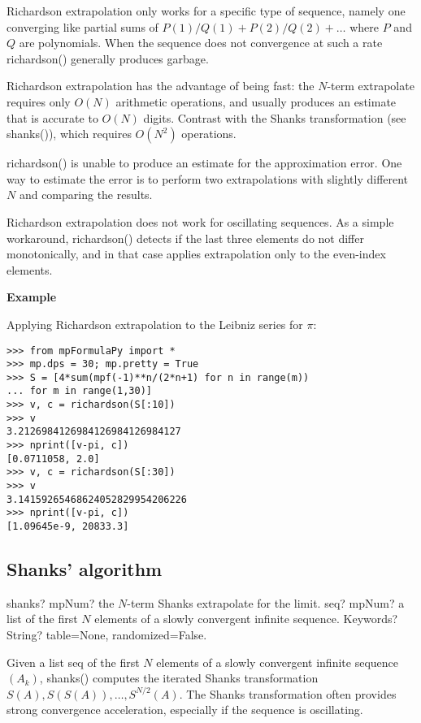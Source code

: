 Richardson extrapolation only works for a specific type of sequence, namely one converging like partial sums of $P(1)/Q(1) + P(2)/Q(2) + \dots$ where $P$ and $Q$ are polynomials. When the sequence does not convergence at such a rate richardson() generally produces garbage.

\vpara
Richardson extrapolation has the advantage of being fast: the $N$-term extrapolate requires only $O(N)$ arithmetic operations, and usually produces an estimate that is accurate to $O(N)$ digits. Contrast with the Shanks transformation (see shanks()), which requires $O(N^2)$ operations.

\vpara
richardson() is unable to produce an estimate for the approximation error. One way to estimate the error is to perform two extrapolations with slightly different $N$ and comparing the results.


Richardson extrapolation does not work for oscillating sequences. As a simple workaround, richardson() detects if the last three elements do not differ monotonically, and in that case applies extrapolation only to the even-index elements.

\vpara
\textbf{Example}

Applying Richardson extrapolation to the Leibniz series for $\pi$:

\begin{lstlisting}
>>> from mpFormulaPy import *
>>> mp.dps = 30; mp.pretty = True
>>> S = [4*sum(mpf(-1)**n/(2*n+1) for n in range(m))
... for m in range(1,30)]
>>> v, c = richardson(S[:10])
>>> v
3.2126984126984126984126984127
>>> nprint([v-pi, c])
[0.0711058, 2.0]
>>> v, c = richardson(S[:30])
>>> v
3.14159265468624052829954206226
>>> nprint([v-pi, c])
[1.09645e-9, 20833.3]
\end{lstlisting}




\subsection{Shanks' algorithm}

\begin{mpFunctionsExtract}
	\mpFunctionTwo
	{shanks? mpNum? the $N$-term Shanks extrapolate for the limit.}
	{seq? mpNum? a list of the first $N$ elements of a slowly convergent infinite sequence.}	
	{Keywords? String? table=None, randomized=False.}	
\end{mpFunctionsExtract}


\vpara
Given a list seq of the first $N$ elements of a slowly convergent infinite sequence $(A_k)$, shanks() computes the iterated Shanks transformation $S(A),S(S(A)),\ldots,S^{N/2}(A)$. The Shanks transformation often provides strong convergence acceleration, especially if the sequence is oscillating.

